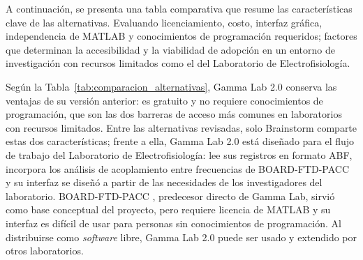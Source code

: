 \documentclass[12pt,letterpaper,oneside]{article}
\begin{document}
A continuación, se presenta una tabla comparativa que resume las características clave de las alternativas. Evaluando licenciamiento, costo, interfaz gráfica, independencia de MATLAB y conocimientos de programación requeridos; factores que determinan la accesibilidad y la viabilidad de adopción  en un entorno de investigación con recursos limitados como el del Laboratorio de Electrofisiología. 

\begin{table}[h!]
\centering
\renewcommand{\arraystretch}{1.3}
\caption{Comparación de alternativas para análisis de señales neurofisiológicas}
\label{tab:comparacion_alternativas}
\end{table}

Según la Tabla~\ref{tab:comparacion_alternativas}, Gamma Lab 2.0 conserva las ventajas de su versión anterior: es gratuito y no requiere conocimientos de programación, que son las dos barreras de acceso más comunes en laboratorios con recursos limitados. Entre las alternativas revisadas, solo Brainstorm comparte estas dos características; frente a ella, Gamma Lab 2.0 está diseñado para el flujo de trabajo del Laboratorio de Electrofisiología: lee sus registros en formato ABF, incorpora los análisis de acoplamiento entre frecuencias de BOARD-FTD-PACC y su interfaz se diseñó a partir de las necesidades de los investigadores del laboratorio. BOARD-FTD-PACC \cite{gauthier2023}, predecesor directo de Gamma Lab, sirvió como base conceptual del proyecto, pero requiere licencia de MATLAB y su interfaz es difícil de usar para personas sin conocimientos de programación. Al distribuirse como \textit{software} libre, Gamma Lab 2.0 puede ser usado y extendido por otros laboratorios.
\end{document}
